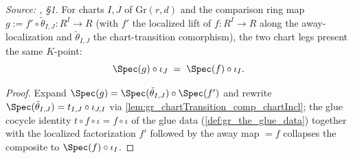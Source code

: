 \begin{lemma}\leanok
  \label{lem:gr_existence_chart_kpoint_eq}
  \textit{Source: \cite{nitsure-hilbert-quot}, \S 1.}
  For charts \(I, J\) of \(\mathrm{Gr}(r,d)\) and the comparison ring map
  \(g := f' \circ \tilde\theta_{I,J} : R^I \to R\) (with \(f'\) the localized lift of
  \(f : R^I \to R\) along the away-localization and \(\tilde\theta_{I,J}\) the chart-transition
  comorphism), the two chart legs present the same \(K\)-point:
  \[
    \Spec(g) \circ \iota_J \;=\; \Spec(f) \circ \iota_I .
  \]
\end{lemma}
\begin{proof}
  \leanok
  Expand \(\Spec(g) = \Spec(\tilde\theta_{I,J}) \circ \Spec(f')\) and rewrite
  \(\Spec(\tilde\theta_{I,J}) = t_{I,J} \circ \iota_{J,I}\) via
  \cref{lem:gr_chartTransition_comp_chartIncl}; the glue cocycle identity
  \(t \circ f \circ \iota = f \circ \iota\) of the glue data (\cref{def:gr_the_glue_data}) together with
  the localized factorization \(f' \) followed by the away map \(= f\) collapses the composite to
  \(\Spec(f) \circ \iota_I\).
\end{proof}


